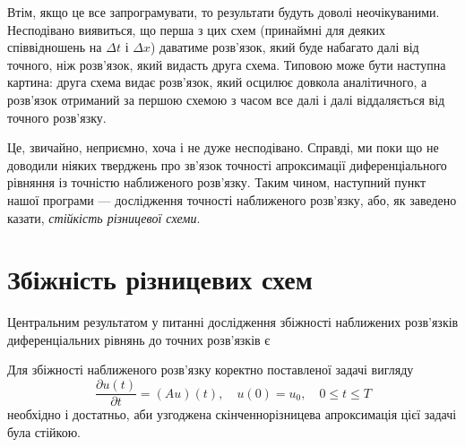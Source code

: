 Втім, якщо це все запрограмувати, то результати будуть доволі неочікуваними. Несподівано виявиться, що перша з цих схем (принаймні для деяких співвідношень на $\Delta t$ і $\Delta x$) даватиме розв'язок, який буде набагато далі від точного, ніж розв'язок, який видасть друга схема. Типовою може бути наступна картина: друга схема видає розв'язок, який осцилює довкола аналітичного, а розв'язок отриманий за першою схемою з часом все далі і далі віддаляється від точного розв'язку. \medskip

Це, звичайно, неприємно, хоча і не дуже несподівано. Справді, ми поки що не доводили ніяких тверджень про зв'язок точності апроксимації диференціального рівняння із точністю наближеного розв'язку. Таким чином, наступний пункт нашої програми --- дослідження точності наближеного розв'язку, або, як заведено казати, \textit{стійкість різницевої схеми}.

\section{Збіжність різницевих схем}

Центральним результатом у питанні дослідження збіжності наближених розв'язків диференціальних рівнянь до точних розв'язків є
\begin{theorem}
    Для збіжності наближеного розв'язку коректно поставленої задачі вигляду
    \begin{equation}
        \frac{\partial u(t)}{\partial t} = (A u)(t), \quad u(0) = u_0, \quad 0 \le t \le T
    \end{equation}
    необхідно і достатньо, аби узгоджена скінченнорізницева апроксимація цієї задачі була стійкою.
\end{theorem}

